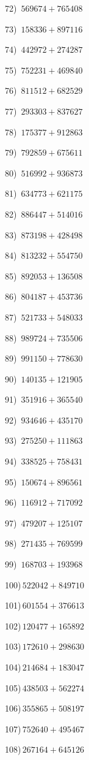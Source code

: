 \documentclass{article}
\begin{document}
\begin{multicols}{2}
72)$\,\,\,569674+765408$ \par 
73)$\,\,\,158336+897116$ \par 
74)$\,\,\,442972+274287$ \par 
75)$\,\,\,752231+469840$ \par 
76)$\,\,\,811512+682529$ \par 
77)$\,\,\,293303+837627$ \par 
78)$\,\,\,175377+912863$ \par 
79)$\,\,\,792859+675611$ \par 
80)$\,\,\,516992+936873$ \par 
81)$\,\,\,634773+621175$ \par 
82)$\,\,\,886447+514016$ \par 
83)$\,\,\,873198+428498$ \par 
84)$\,\,\,813232+554750$ \par 
85)$\,\,\,892053+136508$ \par 
86)$\,\,\,804187+453736$ \par 
87)$\,\,\,521733+548033$ \par 
88)$\,\,\,989724+735506$ \par 
89)$\,\,\,991150+778630$ \par 
90)$\,\,\,140135+121905$ \par 
91)$\,\,\,351916+365540$ \par 
92)$\,\,\,934646+435170$ \par 
93)$\,\,\,275250+111863$ \par 
94)$\,\,\,338525+758431$ \par 
95)$\,\,\,150674+896561$ \par 
96)$\,\,\,116912+717092$ \par 
97)$\,\,\,479207+125107$ \par 
98)$\,\,\,271435+769599$ \par 
99)$\,\,\,168703+193968$ \par 
100)$\,522042+849710$ \par 
101)$\,601554+376613$ \par 
102)$\,120477+165892$ \par 
103)$\,172610+298630$ \par 
104)$\,214684+183047$ \par 
105)$\,438503+562274$ \par 
106)$\,355865+508197$ \par 
107)$\,752640+495467$ \par 
108)$\,267164+645126$ \par 

\end{multicols}
\end{document}
